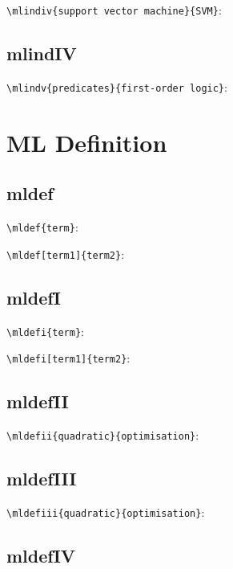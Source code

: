 \documentclass{article}
\begin{document}
\verb|\mlindiv{support vector machine}{SVM}|:
 \

\subsection{mlindIV}

\verb||:
\mlindv{predicates}{first-order logic} \

\section{ML Definition}

\subsection{mldef}

\verb||:
\mldef{term} \

\verb||:
\mldef[term1]{term2} \

\subsection{mldefI}

\verb||:
\mldefi{term} \

\verb||:
\mldefi[term1]{term2} \

\subsection{mldefII}

\verb||:
\mldefii{quadratic}{optimisation} \

\subsection{mldefIII}

\verb||:
\mldefiii{quadratic}{optimisation} \

\subsection{mldefIV}
\end{document}
